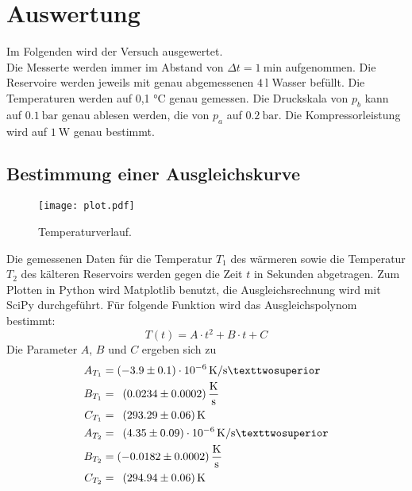 \section{Auswertung}
\label{sec:Auswertung}
Im Folgenden wird der Versuch ausgewertet.\\
Die Messerte werden immer im Abstand von $\Delta t = \SI{1}{\minute}$ aufgenommen.
Die Reservoire werden jeweils mit genau abgemessenen $\SI{4}{\litre}$ Wasser befüllt.
Die Temperaturen werden auf 0,1 $ \si{\celsius} $ genau gemessen.
Die Druckskala von $ p_b $ kann auf $ \SI{0,1}{\bar} $ genau ablesen werden, die von $ p_a $ auf $ \SI{0,2}{\bar} $.
Die Kompressorleistung wird auf $ \SI{1}{\watt} $ genau bestimmt.
\subsection{Bestimmung einer Ausgleichskurve}
\begin{figure}[H]
  \centering
  \texttt{[image: plot.pdf]}
  \caption{Temperaturverlauf.}
  \label{fig:plot}
\end{figure}
Die gemessenen Daten für die Temperatur $T_1$ des wärmeren sowie die Temperatur
$T_2$ des kälteren Reservoirs werden gegen die Zeit $t$ in Sekunden abgetragen.
Zum Plotten in Python wird Matplotlib benutzt, die Ausgleichsrechnung wird mit SciPy durchgeführt.
Für folgende Funktion wird das Ausgleichspolynom bestimmt:
\begin{equation}
  T(t)=A \cdot t^2 + B \cdot t + C
\end{equation}
Die Parameter $A$, $B$ und $C$ ergeben sich zu
\begin{align*}
A_{T_1} &= \SI[per-mode=fraction]{-3.9 +- 0.1e-6}{\kelvin\per\second²} \\
B_{T_1} &= \phantom{1}\SI[per-mode=fraction]{0.0234 +- 0.0002}{\kelvin\per\second} \\
C_{T_1} &= \phantom{1}\SI[per-mode=fraction]{293.29 +- 0.06}{\kelvin} \\
A_{T_2} &= \phantom{1}\SI[per-mode=fraction]{4.35 +- 0.09e-6}{\kelvin\per\second²}  \\
 B_{T_2} &= \SI[per-mode=fraction]{-0.0182 +- 0.0002}{\kelvin\per\second} \\
  C_{T_2} &= \phantom{1}\SI[per-mode=fraction]{294.94 +- 0.06}{\kelvin}
\end{align*}

